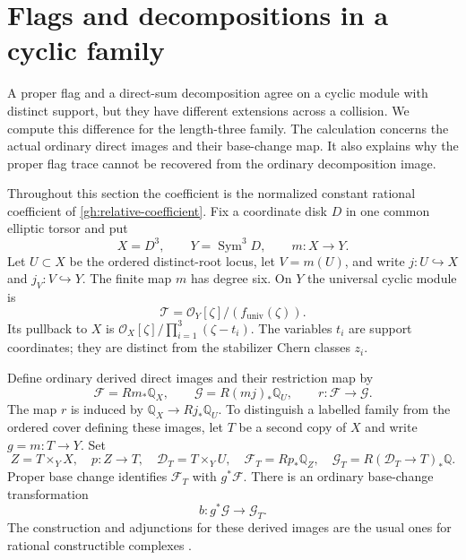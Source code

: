 \section{Flags and decompositions in a cyclic family}
\label{sec:companion-family}

A proper flag and a direct-sum decomposition agree on a cyclic module
with distinct support, but they have different extensions across a
collision. We compute this difference for the length-three family.
The calculation concerns the actual ordinary direct images and their
base-change map. It also explains why the proper flag trace cannot be
recovered from the ordinary decomposition image.

Throughout this section the coefficient is the normalized constant
rational coefficient of \eqref{gh:relative-coefficient}. Fix a coordinate
disk $D$ in one common elliptic torsor and put
\[
 X=D^3,\qquad Y=\operatorname{Sym}^3D,\qquad m:X\longrightarrow Y.
\]
Let $U\subset X$ be the ordered distinct-root locus, let $V=m(U)$,
and write $j:U\hookrightarrow X$ and $j_V:V\hookrightarrow Y$.
The finite map $m$ has degree six. On $Y$ the universal cyclic module is
\[
 \mathcal T=\mathcal O_Y[\zeta]/(f_{\mathrm{univ}}(\zeta)).
\]
Its pullback to $X$ is
$\mathcal O_X[\zeta]/\prod_{i=1}^3(\zeta-t_i)$.
The variables $t_i$ are support coordinates; they are distinct from
the stabilizer Chern classes $z_i$.

Define ordinary derived direct images and their restriction map by
\begin{equation}\label{cf:images}
 \mathcal F=Rm_*\mathbb Q_X,\qquad
 \mathcal G=R(mj)_*\mathbb Q_U,\qquad
 r:\mathcal F\longrightarrow\mathcal G.
\end{equation}
The map $r$ is induced by $\mathbb Q_X\to Rj_*\mathbb Q_U$.
To distinguish a labelled family from the ordered cover defining
these images, let $T$ be a second copy of $X$ and write $g=m:T\to Y$.
Set
\[
 Z=T\times_YX,\quad p:Z\to T,\quad
 \mathcal D_T=T\times_YU,\quad
 \mathcal F_T=Rp_*\mathbb Q_Z,\quad
 \mathcal G_T=R(\mathcal D_T\to T)_*\mathbb Q.
\]
Proper base change identifies $\mathcal F_T$ with $g^*\mathcal F$.
There is an ordinary base-change transformation
\begin{equation}\label{cf:base-change}
 b:g^*\mathcal G\longrightarrow\mathcal G_T.
\end{equation}
The construction and adjunctions for these derived images are the
usual ones for rational constructible complexes
\cite[\S\S3.4,4.1.4,4.3.2--4.3.3]{deCataldoMigliorini2007}.

